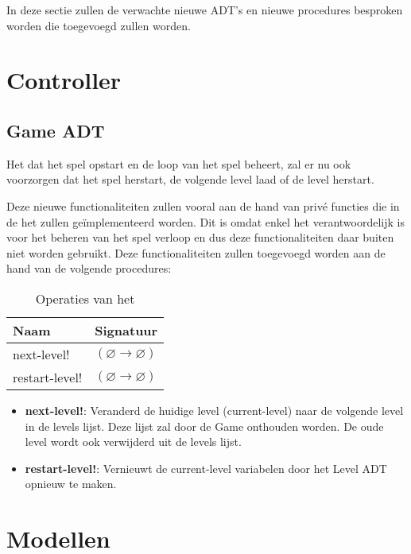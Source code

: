 In deze sectie zullen de verwachte nieuwe ADT's 
en nieuwe procedures besproken worden die toegevoegd zullen worden.

\section{Controller}
\label{controller}
\subsection{Game ADT}
\label{section:game}
Het \texttt{} dat het spel opstart en de loop van het spel beheert,
zal er nu ook voorzorgen dat het spel herstart,
de volgende level laad 
of de level herstart.

Deze nieuwe functionaliteiten zullen vooral aan de hand van privé functies 
die in de het \texttt{} zullen geïmplementeerd worden.
Dit is omdat enkel het \texttt{} verantwoordelijk is voor het beheren van het spel verloop 
en dus deze functionaliteiten daar buiten niet worden gebruikt.
Deze functionaliteiten zullen toegevoegd worden aan de hand van de volgende procedures:

\begin{table}[hbt]
\centering
\begin{tabular}{|ll|}
\hline
\rowcolor[HTML]{000000} 
{\color[HTML]{FFFFFF} \textbf{Naam}} & {\color[HTML]{FFFFFF} \textbf{Signatuur}} \\ \hline
next-level!    & $(\varnothing \rightarrow \varnothing)$     	 \\ \hline
restart-level! & $(\varnothing \rightarrow \varnothing)$     	 \\ \hline
\end{tabular}
\caption{Operaties van het \texttt{}}
\label{table:1}
\end{table}

\begin{itemize}
	\item \textbf{next-level!}: Veranderd de huidige level (current-level) naar de volgende level in de levels lijst.
		Deze lijst zal door de Game onthouden worden.
		De oude level wordt ook verwijderd uit de levels lijst.
	\item \textbf{restart-level!}: Vernieuwt de current-level variabelen
		door het Level ADT opnieuw te maken.
\end{itemize}

\section{Modellen}
\label{model}

